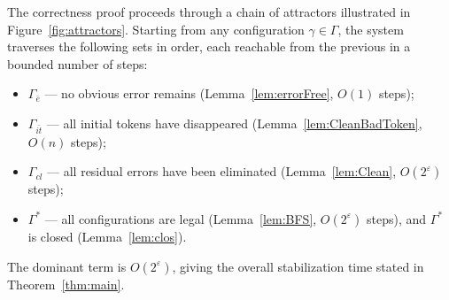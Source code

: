 \documentclass[a4paper, 12pt]{article}
\begin{document}
The correctness proof proceeds through a chain of attractors illustrated 
in Figure~\ref{fig:attractors}. Starting from any configuration 
$\gamma \in \Gamma$, the system traverses the following sets in order, 
each reachable from the previous in a bounded number of steps:
\begin{itemize}
    \item $\Gamma_{\bar{e}}$ — no obvious error remains 
          (Lemma~\ref{lem:errorFree}, $O(1)$ steps);
    \item $\Gamma_{\bar{it}}$ — all initial tokens have disappeared 
          (Lemma~\ref{lem:CleanBadToken}, $O(n)$ steps);
    \item $\Gamma_{cl}$ — all residual errors have been eliminated 
          (Lemma~\ref{lem:Clean}, $O(2^\varepsilon)$ steps);
    \item $\Gamma^*$ — all configurations are legal 
          (Lemma~\ref{lem:BFS}, $O(2^\varepsilon)$ steps), 
          and $\Gamma^*$ is closed (Lemma~\ref{lem:clos}).
\end{itemize}
The dominant term is $O(2^\varepsilon)$, giving the overall stabilization 
time stated in Theorem~\ref{thm:main}.
\end{document}
